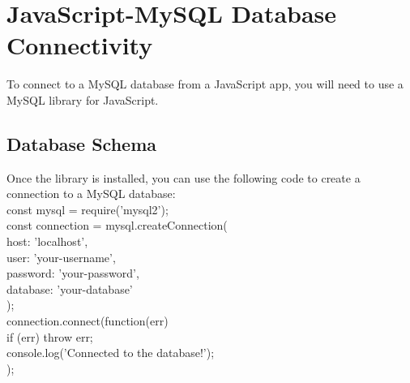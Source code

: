 \chapter{JavaScript-MySQL Database Connectivity}
To connect to a MySQL database from a JavaScript app, you will need to use a MySQL library for JavaScript.\\

\section{Database Schema}
Once the library is installed, you can use the following code to create a connection to a MySQL database:\\

const mysql = require('mysql2');\\

const connection = mysql.createConnection({\\
  host: 'localhost',\\
  user: 'your-username',\\
  password: 'your-password',\\
  database: 'your-database'\\
});\\

connection.connect(function(err) {\\
  if (err) throw err;\\
  console.log('Connected to the database!');\\
});\\
\\



